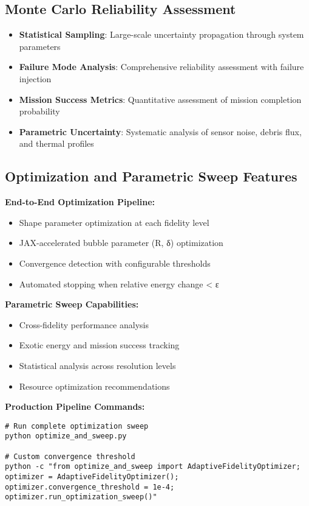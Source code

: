 \documentclass[11pt]{article}
\begin{document}
\subsection{Monte Carlo Reliability Assessment}
\begin{itemize}
\item \textbf{Statistical Sampling}: Large-scale uncertainty propagation through system parameters
\item \textbf{Failure Mode Analysis}: Comprehensive reliability assessment with failure injection
\item \textbf{Mission Success Metrics}: Quantitative assessment of mission completion probability
\item \textbf{Parametric Uncertainty}: Systematic analysis of sensor noise, debris flux, and thermal profiles
\end{itemize}

\subsection{Optimization and Parametric Sweep Features}

\textbf{End-to-End Optimization Pipeline:}
\begin{itemize}
    \item Shape parameter optimization at each fidelity level
    \item JAX-accelerated bubble parameter (R, δ) optimization
    \item Convergence detection with configurable thresholds
    \item Automated stopping when relative energy change < ε
\end{itemize}

\textbf{Parametric Sweep Capabilities:}
\begin{itemize}
    \item Cross-fidelity performance analysis
    \item Exotic energy and mission success tracking
    \item Statistical analysis across resolution levels
    \item Resource optimization recommendations
\end{itemize}

\textbf{Production Pipeline Commands:}
\begin{verbatim}
# Run complete optimization sweep
python optimize_and_sweep.py

# Custom convergence threshold
python -c "from optimize_and_sweep import AdaptiveFidelityOptimizer; 
optimizer = AdaptiveFidelityOptimizer(); 
optimizer.convergence_threshold = 1e-4; 
optimizer.run_optimization_sweep()"
\end{verbatim}
\end{document}
